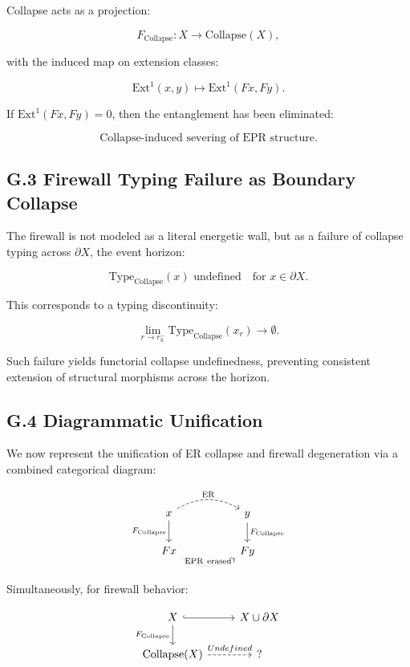\documentclass[11pt]{article}
\begin{document}
Collapse acts as a projection:

\[
F_{\mathrm{Collapse}}: X \to \mathrm{Collapse}(X),
\]

with the induced map on extension classes:

\[
\mathrm{Ext}^1(x, y) \longmapsto \mathrm{Ext}^1(Fx, Fy).
\]

If \( \mathrm{Ext}^1(Fx, Fy) = 0 \), then the entanglement has been eliminated:

\[
\text{Collapse-induced severing of EPR structure}.
\]

\subsection*{G.3 Firewall Typing Failure as Boundary Collapse}

The firewall is not modeled as a literal energetic wall, but as a failure of collapse typing across \( \partial X \), the event horizon:

\[
\mathrm{Type}_{\mathrm{Collapse}}(x) \text{ undefined} \quad \text{for } x \in \partial X.
\]

This corresponds to a typing discontinuity:

\[
\lim_{r \to r_h^-} \mathrm{Type}_{\mathrm{Collapse}}(x_r) \to \emptyset.
\]

Such failure yields functorial collapse undefinedness, preventing consistent extension of structural morphisms across the horizon.

\subsection*{G.4 Diagrammatic Unification}

We now represent the unification of ER collapse and firewall degeneration via a combined categorical diagram:

\[
\begin{tikzcd}
x \arrow[rr, dashed, "\mathrm{ER}", bend left] \arrow[d, "F_{\mathrm{Collapse}}"'] &&
y \arrow[d, "F_{\mathrm{Collapse}}"] \\
Fx \arrow[rr, dotted, "\mathrm{EPR\ erased}", bend right] &&
Fy
\end{tikzcd}
\]

Simultaneously, for firewall behavior:

\[
\begin{tikzcd}
X \arrow[r, hook] \arrow[d, "F_{\mathrm{Collapse}}"'] & X \cup \partial X \\
\mathrm{Collapse}(X) \arrow[r, dashed, "Undefined"] & ?
\end{tikzcd}
\]
\end{document}
